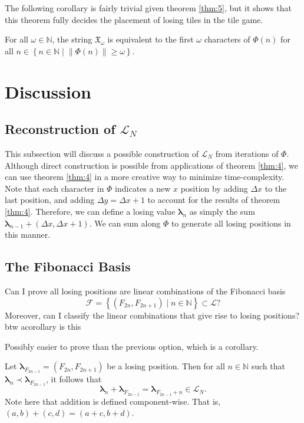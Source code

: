\documentclass[11pt, letterpaper]{article}
\begin{document}
The following corollary is fairly trivial given theorem \ref{thm:5}, but it shows that this theorem fully decides the placement of losing tiles in the tile game.

\begin{corollary}\label{cor:1}
	For all $\omega \in\mathbb{N}$, the string $\mathfrak{X}_\omega $ is equivalent to the first $\omega$ characters of $\Phi(n)$ for all $n\in \left\{ n\in\mathbb{N} \mid \left\lVert \Phi (n) \right\rVert \geq \omega  \right\} $.
\end{corollary}
\section{Discussion}
\subsection{Reconstruction of $\mathcal{L}_N $}
This subsection will discuss a possible construction of $\mathcal{L}_N $ from iterations of $\Phi $. Although direct construction is possible from applications of theorem \ref{thm:4}, we can use theorem \ref{thm:4} in a more creative way to minimize time-complexity. Note that each character in $\Phi $ indicates a new $x$ position by adding $\Delta x$ to the last position, and adding $\Delta  y=\Delta x+1$ to account for the results of theorem \ref{thm:4}. Therefore, we can define a losing value $\boldsymbol{\lambda}_n$ as simply the sum $\boldsymbol{\lambda}_{n-1}+(\Delta x,\Delta x+1)$. We can sum along $\Phi $ to generate all losing positions in this manner.
\subsection{The Fibonacci Basis}
Can I prove all losing positions are linear combinations of the Fibonacci basis
\[
	\mathcal{F} =\left\{ (F_{2n},F_{2n+1}) \mid n\in\mathbb{N} \right\} \subset \mathcal{L} 
?\]
Moreover, can I classify the linear combinations that give rise to losing positions? btw  acorollary is this
\begin{lemma}\label{lma:5a}
	Possibly easier to prove than the previous option, which is a corollary.

	Let $\boldsymbol{\lambda}_{F_{2n-1}}=\left( F_{2n},F_{2n+1} \right) $ be a losing position. Then for all $n\in\mathbb{N}$ such that $\boldsymbol{\lambda}_n\prec \boldsymbol{\lambda}_{F_{2n-1}}$, it follows that
	\[
		\boldsymbol{\lambda}_n+\boldsymbol{\lambda}_{F_{2n-1}}= \boldsymbol{\lambda}_{F_{2n-1}+n}\in \mathcal{L}_N
	.\]
	Note here that addition is defined component-wise. That is, $(a,b)+(c,d)=(a+c,b+d)$.
\end{lemma}
\end{document}
